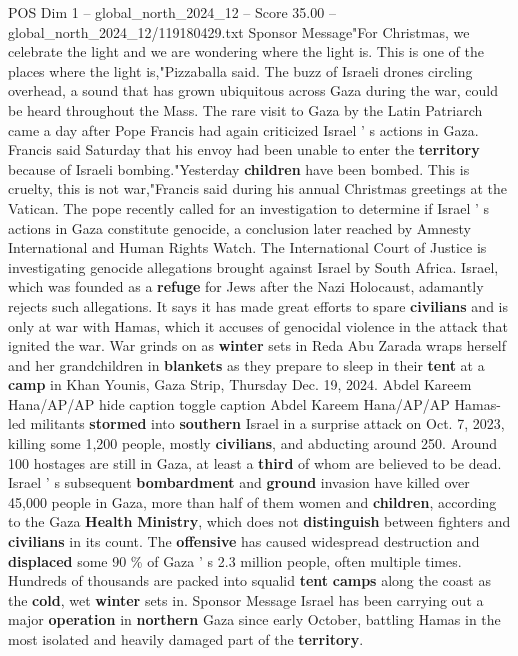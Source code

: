 \begin{textsample}{POS Dim 1 – global\_north\_2024\_12 – Score 35.00 – global\_north\_2024\_12/119180429.txt}
Sponsor Message"For Christmas, we celebrate the light and we are wondering where the light is.
This is one of the places where the light is,"Pizzaballa said.
The buzz of Israeli drones circling overhead, a sound that has grown ubiquitous across Gaza during the war, could be heard throughout the Mass.
The rare visit to Gaza by the Latin Patriarch came a day after Pope Francis had again criticized Israel ' s actions in Gaza.
Francis said Saturday that his envoy had been unable to enter the \textbf{territory} because of Israeli bombing."Yesterday \textbf{children} have been bombed.
This is cruelty, this is not war,"Francis said during his annual Christmas greetings at the Vatican.
The pope recently called for an investigation to determine if Israel ' s actions in Gaza constitute genocide, a conclusion later reached by Amnesty International and Human Rights Watch.
The International Court of Justice is investigating genocide allegations brought against Israel by South Africa.
Israel, which was founded as a \textbf{refuge} for Jews after the Nazi Holocaust, adamantly rejects such allegations.
It says it has made great efforts to spare \textbf{civilians} and is only at war with Hamas, which it accuses of genocidal violence in the attack that ignited the war.
War grinds on as \textbf{winter} sets in Reda Abu Zarada wraps herself and her grandchildren in \textbf{blankets} as they prepare to sleep in their \textbf{tent} at a \textbf{camp} in Khan Younis, Gaza Strip, Thursday Dec. 19, 2024.
Abdel Kareem Hana/AP/AP hide caption toggle caption Abdel Kareem Hana/AP/AP Hamas-led militants \textbf{stormed} into \textbf{southern} Israel in a surprise attack on Oct. 7, 2023, killing some 1,200 people, mostly \textbf{civilians}, and abducting around 250.
Around 100 hostages are still in Gaza, at least a \textbf{third} of whom are believed to be dead.
Israel ' s subsequent \textbf{bombardment} and \textbf{ground} invasion have killed over 45,000 people in Gaza, more than half of them women and \textbf{children}, according to the Gaza \textbf{Health} \textbf{Ministry}, which does not \textbf{distinguish} between fighters and \textbf{civilians} in its count.
The \textbf{offensive} has caused widespread destruction and \textbf{displaced} some 90 \% of Gaza ' s 2.3 million people, often multiple times.
Hundreds of thousands are packed into squalid \textbf{tent} \textbf{camps} along the coast as the \textbf{cold}, wet \textbf{winter} sets in.
Sponsor Message Israel has been carrying out a major \textbf{operation} in \textbf{northern} Gaza since early October, battling Hamas in the most isolated and heavily damaged part of the \textbf{territory}.

\end{textsample}
